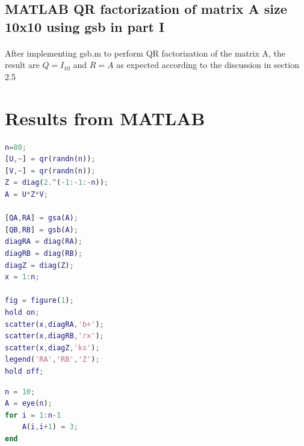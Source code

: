 \documentclass[a4paper]{article}
\begin{document}
\subsection*{MATLAB QR factorization of matrix A size 10x10 using gsb in part I}
\paragraph{}
After implementing gsb.m to perform QR factorization of the matrix A, the result are $Q=I_{10}$ and $R=A$ as expected according to the discussion in section 2.5
\newpage

\section*{Results from MATLAB}
\begin{lstlisting}[language=Matlab, caption=Performing QR-factorization and scatter plots in part II]
n=80;
[U,~] = qr(randn(n));
[V,~] = qr(randn(n));
Z = diag(2.^(-1:-1:-n));
A = U*Z*V;

[QA,RA] = gsa(A);
[QB,RB] = gsb(A);
diagRA = diag(RA);
diagRB = diag(RB);
diagZ = diag(Z);
x = 1:n;

fig = figure(1);
hold on;
scatter(x,diagRA,'b+');
scatter(x,diagRB,'rx');
scatter(x,diagZ,'ks');
legend('RA','RB','Z');
hold off;
\end{lstlisting}

\begin{lstlisting}[language=Matlab, caption=Generating upper triangular Toeplitz matrix of part III]
n = 10;
A = eye(n);
for i = 1:n-1
    A(i,i+1) = 3;
end
\end{lstlisting}
\end{document}

